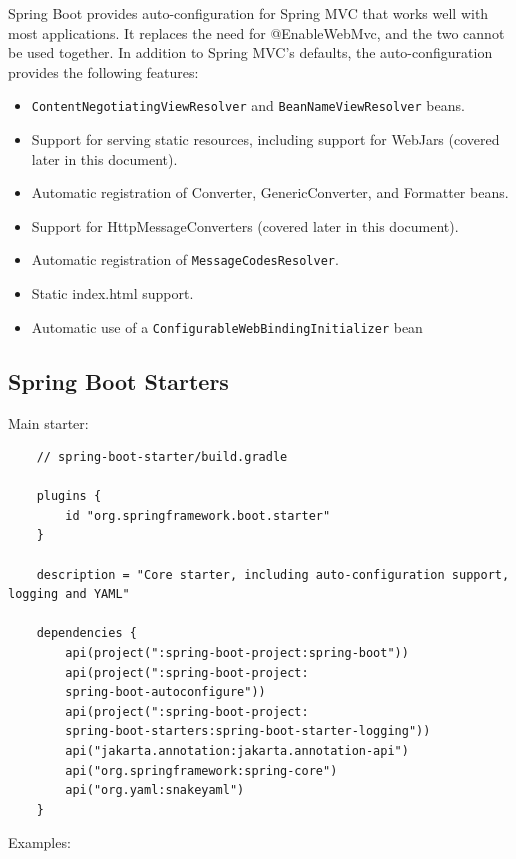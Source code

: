 \documentclass{scrartcl}
\begin{document}
Spring Boot provides auto-configuration for Spring MVC that works well with most applications. It replaces the need for @EnableWebMvc, and the two cannot be used together. In addition to Spring MVC’s defaults, the auto-configuration provides the following features:

\begin{itemize}
    \item \lstinline|ContentNegotiatingViewResolver| and \lstinline|BeanNameViewResolver| beans.
    \item Support for serving static resources, including support for WebJars (covered later in this document).
    \item Automatic registration of Converter, GenericConverter, and Formatter beans.
    \item Support for HttpMessageConverters (covered later in this document).
    \item Automatic registration of \lstinline|MessageCodesResolver|.
    \item Static index.html support.
    \item Automatic use of a \lstinline|ConfigurableWebBindingInitializer| bean
\end{itemize}

\subsection{Spring Boot Starters}

Main starter:

\begin{lstlisting}
    // spring-boot-starter/build.gradle

    plugins {
        id "org.springframework.boot.starter"
    }

    description = "Core starter, including auto-configuration support, logging and YAML"

    dependencies {
        api(project(":spring-boot-project:spring-boot"))
        api(project(":spring-boot-project:
        spring-boot-autoconfigure"))
        api(project(":spring-boot-project:
        spring-boot-starters:spring-boot-starter-logging"))
        api("jakarta.annotation:jakarta.annotation-api")
        api("org.springframework:spring-core")
        api("org.yaml:snakeyaml")
    }
\end{lstlisting}

Examples:
\end{document}
